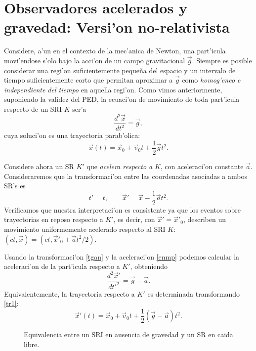 \section{Observadores acelerados y gravedad: Versi'on no-rela\-ti\-vis\-ta}
Considere, a'un en el contexto de la mec'anica de Newton, una part'icula movi'endose s'olo bajo la acci'on de un campo gravitacional $\vec{g}$. Siempre es posible considerar una regi'on suficientemente peque\~na del espacio y un intervalo de tiempo suficientemente corto que permitan aproximar a $\vec{g}$ como \textit{homog'eneo e independiente del tiempo} en aquella regi'on. Como vimos anteriormente, suponiendo la validez del PED, la ecuaci'on de movimiento de toda part'icula respecto de un SRI $K$ ser'a
\begin{equation}\label{enmp}
\frac{d^2\vec{x}}{dt^2}=\vec{g},
\end{equation}
cuya soluci'on es una trayectoria parab'olica:
\begin{equation}\label{tr1}
\vec{x}(t)=\vec{x}_0+\vec{v}_0t+\frac{1}2\vec{g}t^2.
\end{equation}

Considere ahora un SR $K'$ que \textit{acelera respecto a} $K$, con aceleraci'on constante $\vec{a}$. Consideraremos que la transformaci'on entre las coordenadas asociadas a ambos SR's es 
\begin{equation}\label{tgan}
t'=t, \qquad \vec{x}'=\vec{x}-\frac{1}2\vec{a}t^2.
\end{equation}
Verificamos que nuestra interpretaci'on es consistente ya que los eventos sobre trayectorias en reposo respecto a $K'$, es decir, con $\vec{x}'=\vec{x}'_0$, describen un movimiento uniformemente acelerado respecto al SRI $K$: $(ct,\vec{x})=(ct,\vec{x}'_0+\vec{a}t^2/2)$.

Usando la transformaci'on \eqref{tgan} y la aceleraci'on \eqref{enmp} podemos calcular la aceleraci'on de la part'icula respecto a $K'$, obteniendo
\begin{equation}\label{acelprima}
\frac{d^2\vec{x}'}{dt'^2}=\vec{g}-\vec{a}.
\end{equation}
Equivalentemente, la trayectoria respecto a $K'$ es determinada transformando  \eqref{tr1}:
\begin{equation}
\vec{x}'(t)=\vec{x}_0+\vec{v}_0t+\frac{1}2(\vec{g}-\vec{a})t^2.
\end{equation}
\begin{center}
\begin{figure}[H]
\centerline{}
\caption{Equivalencia entre un SRI en ausencia de gravedad y un SR en caida libre.}
\label{fig:equiv2}
\end{figure}
\end{center}

